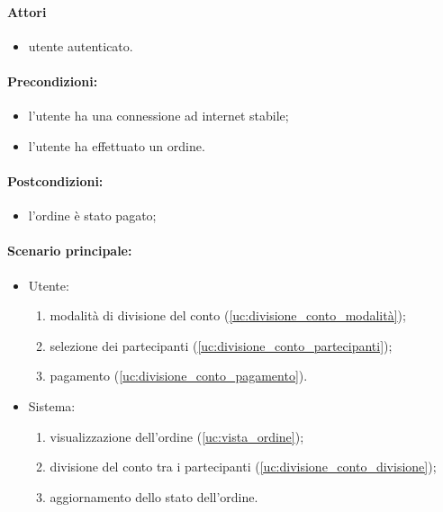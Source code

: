 \label{uc:divisione_conto}

\paragraph{Attori}
\begin{itemize}
	\item utente autenticato.
\end{itemize}

\paragraph{Precondizioni:}
\begin{itemize}
	\item l'utente ha una connessione ad internet stabile;
	\item l'utente ha effettuato un ordine.
\end{itemize}

\paragraph{Postcondizioni:}
\begin{itemize}
	\item l'ordine è stato pagato;
\end{itemize}

\paragraph{Scenario principale:}
\begin{itemize}
	\item Utente:
	      \begin{enumerate}
		      \item modalità di divisione del conto (\autoref{uc:divisione_conto_modalità});
		      \item selezione dei partecipanti (\autoref{uc:divisione_conto_partecipanti});
		      \item pagamento (\autoref{uc:divisione_conto_pagamento}).
	      \end{enumerate}
	\item Sistema:
	      \begin{enumerate}
		      \item visualizzazione dell'ordine (\autoref{uc:vista_ordine});
		      \item divisione del conto tra i partecipanti (\autoref{uc:divisione_conto_divisione});
		      \item aggiornamento dello stato dell'ordine.
	      \end{enumerate}
\end{itemize}


